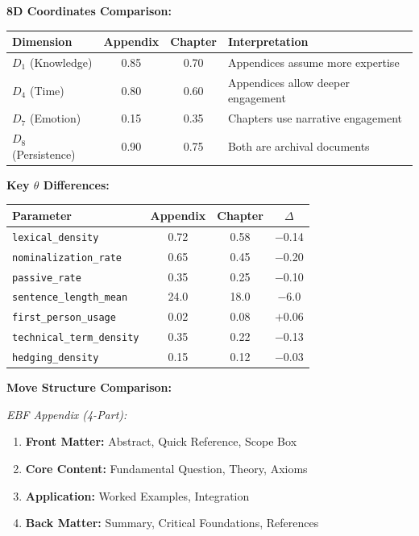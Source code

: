 \textbf{8D Coordinates Comparison:}
\begin{center}
\begin{tabular}{lccl}
\toprule
Dimension & Appendix & Chapter & Interpretation \\
\midrule
$D_1$ (Knowledge) & 0.85 & 0.70 & Appendices assume more expertise \\
$D_4$ (Time) & 0.80 & 0.60 & Appendices allow deeper engagement \\
$D_7$ (Emotion) & 0.15 & 0.35 & Chapters use narrative engagement \\
$D_8$ (Persistence) & 0.90 & 0.75 & Both are archival documents \\
\bottomrule
\end{tabular}
\end{center}

\textbf{Key $\theta$ Differences:}
\begin{center}
\begin{tabular}{lccc}
\toprule
Parameter & Appendix & Chapter & $\Delta$ \\
\midrule
\texttt{lexical\_density} & 0.72 & 0.58 & $-$0.14 \\
\texttt{nominalization\_rate} & 0.65 & 0.45 & $-$0.20 \\
\texttt{passive\_rate} & 0.35 & 0.25 & $-$0.10 \\
\texttt{sentence\_length\_mean} & 24.0 & 18.0 & $-$6.0 \\
\texttt{first\_person\_usage} & 0.02 & 0.08 & $+$0.06 \\
\texttt{technical\_term\_density} & 0.35 & 0.22 & $-$0.13 \\
\texttt{hedging\_density} & 0.15 & 0.12 & $-$0.03 \\
\bottomrule
\end{tabular}
\end{center}

\textbf{Move Structure Comparison:}

\textit{EBF Appendix (4-Part):}
\begin{enumerate}
    \item \textbf{Front Matter:} Abstract, Quick Reference, Scope Box
    \item \textbf{Core Content:} Fundamental Question, Theory, Axioms
    \item \textbf{Application:} Worked Examples, Integration
    \item \textbf{Back Matter:} Summary, Critical Foundations, References
\end{enumerate}

